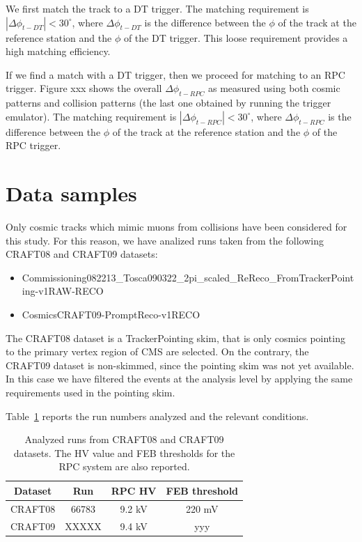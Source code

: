 We first match the track to a DT trigger.
The matching requirement is $|\Delta\phi_{t-DT}| < 30^\circ$,
where $\Delta\phi_{t-DT}$ is the difference 
between the $\phi$ of the track at the reference station and 
the $\phi$ of the DT trigger. This loose requirement 
provides a high matching efficiency.

If we find a match with a DT trigger, then we proceed
for matching to an RPC trigger. 
Figure xxx shows the overall $\Delta\phi_{t-RPC}$ as measured 
using both cosmic patterns and collision patterns (the
last one obtained by running the trigger emulator).
The matching requirement is $|\Delta\phi_{t-RPC}| < 30^\circ$,
where $\Delta\phi_{t-RPC}$ is the difference 
between the $\phi$ of the track at the reference station 
and the $\phi$ of the RPC trigger.

\section{Data samples}
Only cosmic tracks which mimic muons from collisions
have been considered for this study. 
For this reason, we have analized runs taken from the 
following CRAFT08 and CRAFT09 datasets:
\begin{itemize}
\item
Commissioning08\/2213\_Tosca090322\_2pi\_scaled\_ReReco\_FromTrackerPointing-v1\/RAW-RECO
\item
Cosmics\/CRAFT09-PromptReco-v1\/RECO
\end{itemize}

The CRAFT08 dataset is a TrackerPointing skim, that is 
only cosmics pointing to the primary vertex 
region of CMS are selected. 
On the contrary, the CRAFT09 dataset is non-skimmed, 
since the pointing skim was not yet 
available. In this case we have filtered the 
events at the analysis level by applying the same
requirements used in the pointing skim.

Table~\ref{tab:runs} reports the run numbers analyzed and the relevant
conditions.
 \begin{table}[htb]
    \label{tab:runs}
    \begin{center}
      \begin{tabular}{|c|c|c|c|} \hline
Dataset & Run   & RPC HV & FEB threshold \\ \hline
CRAFT08 & 66783 & 9.2 kV & 220 mV \\ \hline
CRAFT09 & XXXXX & 9.4 kV & yyy \\ \hline
      \end{tabular}
      \caption{Analyzed runs from CRAFT08 
and CRAFT09 datasets. The HV value and FEB thresholds for
the RPC system are also reported.}
    \end{center}
  \end{table}


